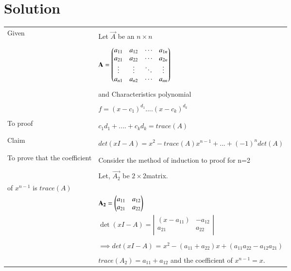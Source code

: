 \documentclass[journal,12pt]{IEEEtran}
\begin{document}
\section{\textbf{Solution}}
\renewcommand{\thetable}{1}
\begin{longtable}{|l|l|}
\hline
\multirow{3}{*}{Given} & \\
& Let $\vec{A}$ be an $n\times n$ \\
&\\
& $\mathbf{A} = \begin{pmatrix}a_{11}&a_{12}&\cdots &a_{1n} \\
a_{21}&a_{22}&\cdots &a_{2n} \\
\vdots & \vdots & \ddots & \vdots\\
a_{n1}&a_{n2}&\cdots &a_{nn}\end{pmatrix}$\\
&\\
& and Characteristics polynomial\\
&\\
&  $f= (x-c_1)^{d_1}....(x-c_k)^{d_k}$\\
&\\
\hline
\multirow{3}{*}{To proof} & \\
& $c_1d_1+....+c_kd_k = trace(A)$\\
&\\
\hline
\multirow{3}{*}{Claim} & \\
&  $det(xI-A) = x^2 - trace(A)x^{n-1}+...+(-1)^ndet(A)$ \\
&\\
\hline
\multirow{3}{*}{To prove that the coefficient} &\\
& Consider the method of induction to proof for n=2\\ 
&\\
& Let, $\vec{A_2}$ be $2\times2$matrix.\\ 
of $x^{n-1}$ is $trace(A)$ 
&\\
& $\mathbf{A_2}=\begin{pmatrix}a_{11}&a_{12}\\a_{21}&a_{22}\end{pmatrix}$\\
& $\det(xI-A)= \left|
                \begin{array}{ccc}
                (x-a_{11}) & -a_{12}\\
                a_{21}& a_{22}\\
                \end{array} \right|$  \\
&\\
& $\implies det(xI-A)$ = $x^2 - (a_{11}+a_{22})x+(a_{11}a_{22}-a_{12}a_{21})$\\
 &\\
& $\boxed {trace(A_2) = a_{11}+a_{12}}$ and the coefficient of $\boxed{x^{n-1} = x}$.\\

\end{longtable}
\end{document}
